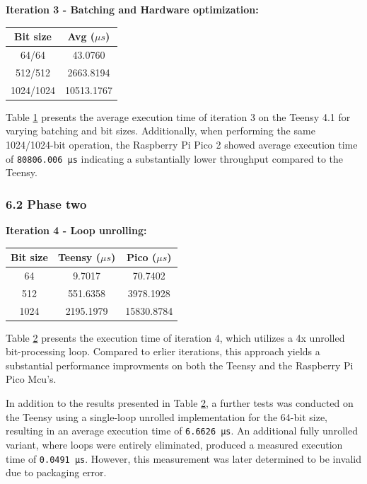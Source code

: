\textbf{Iteration 3 - Batching and Hardware optimization:}

\begin{table}[ht]\begin{tabular}{|c|c|} \hline \textbf{Bit size} &
\multicolumn{1}{c|}{\textbf{Avg ($\mu s$)}} \\ \hline 64/64 & 43.0760 \\ 512/512
& 2663.8194 \\ 1024/1024 & 10513.1767 \\ \hline \end{tabular}
\label{tab:iter3}\end{table}

Table \ref{tab:iter3} presents the average execution time of iteration 3 on the Teensy 4.1 for varying batching and bit sizes. Additionally, when performing the same 1024/1024-bit operation, the Raspberry Pi Pico 2 showed average execution time of \texttt{80806.006\ µs} indicating a substantially lower throughput compared to the Teensy.

\hypertarget{phase-two-1}{%
\subsubsection{6.2 Phase two}\label{phase-two-1}}

\textbf{Iteration 4 - Loop unrolling:}

\begin{table}[ht]\begin{tabular}{|c|c|c|} \hline \textbf{Bit size} &
\multicolumn{1}{c|}{\textbf{Teensy ($\mu s$)}} &
\multicolumn{1}{c|}{\textbf{Pico ($\mu s$)}} \\ \hline 64 & 9.7017 & 70.7402 \\
512 & 551.6358 & 3978.1928 \\ 1024 & 2195.1979 & 15830.8784 \\ \hline
\end{tabular} \label{tab:iter4}\end{table}

Table \ref{tab:iter4} presents the execution time of iteration 4, which utilizes a 4x unrolled bit-processing loop. Compared to erlier iterations, this approach yields a substantial performance improvments on both the Teensy and the Raspberry Pi Pico Mcu's.

In addition to the results presented in Table \ref{tab:iter4}, a further tests was conducted on the Teensy using a single-loop unrolled implementation for the 64-bit size, resulting in an average execution time of \texttt{6.6626\ µs}. An additional fully unrolled variant, where loops were entirely eliminated, produced a measured execution time of \texttt{0.0491\ µs}. However, this measurement was later determined to be invalid due to packaging error.


